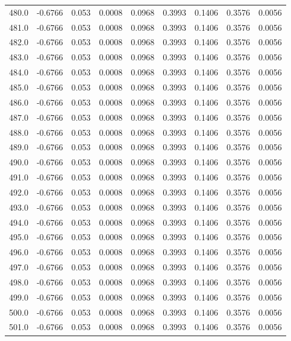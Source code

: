 \begin{longtable}{lrrrrrrrr}
480.0 & -0.6766 & 0.053 & 0.0008 & 0.0968 & 0.3993 & 0.1406 & 0.3576 & 0.0056 \\
481.0 & -0.6766 & 0.053 & 0.0008 & 0.0968 & 0.3993 & 0.1406 & 0.3576 & 0.0056 \\
482.0 & -0.6766 & 0.053 & 0.0008 & 0.0968 & 0.3993 & 0.1406 & 0.3576 & 0.0056 \\
483.0 & -0.6766 & 0.053 & 0.0008 & 0.0968 & 0.3993 & 0.1406 & 0.3576 & 0.0056 \\
484.0 & -0.6766 & 0.053 & 0.0008 & 0.0968 & 0.3993 & 0.1406 & 0.3576 & 0.0056 \\
485.0 & -0.6766 & 0.053 & 0.0008 & 0.0968 & 0.3993 & 0.1406 & 0.3576 & 0.0056 \\
486.0 & -0.6766 & 0.053 & 0.0008 & 0.0968 & 0.3993 & 0.1406 & 0.3576 & 0.0056 \\
487.0 & -0.6766 & 0.053 & 0.0008 & 0.0968 & 0.3993 & 0.1406 & 0.3576 & 0.0056 \\
488.0 & -0.6766 & 0.053 & 0.0008 & 0.0968 & 0.3993 & 0.1406 & 0.3576 & 0.0056 \\
489.0 & -0.6766 & 0.053 & 0.0008 & 0.0968 & 0.3993 & 0.1406 & 0.3576 & 0.0056 \\
490.0 & -0.6766 & 0.053 & 0.0008 & 0.0968 & 0.3993 & 0.1406 & 0.3576 & 0.0056 \\
491.0 & -0.6766 & 0.053 & 0.0008 & 0.0968 & 0.3993 & 0.1406 & 0.3576 & 0.0056 \\
492.0 & -0.6766 & 0.053 & 0.0008 & 0.0968 & 0.3993 & 0.1406 & 0.3576 & 0.0056 \\
493.0 & -0.6766 & 0.053 & 0.0008 & 0.0968 & 0.3993 & 0.1406 & 0.3576 & 0.0056 \\
494.0 & -0.6766 & 0.053 & 0.0008 & 0.0968 & 0.3993 & 0.1406 & 0.3576 & 0.0056 \\
495.0 & -0.6766 & 0.053 & 0.0008 & 0.0968 & 0.3993 & 0.1406 & 0.3576 & 0.0056 \\
496.0 & -0.6766 & 0.053 & 0.0008 & 0.0968 & 0.3993 & 0.1406 & 0.3576 & 0.0056 \\
497.0 & -0.6766 & 0.053 & 0.0008 & 0.0968 & 0.3993 & 0.1406 & 0.3576 & 0.0056 \\
498.0 & -0.6766 & 0.053 & 0.0008 & 0.0968 & 0.3993 & 0.1406 & 0.3576 & 0.0056 \\
499.0 & -0.6766 & 0.053 & 0.0008 & 0.0968 & 0.3993 & 0.1406 & 0.3576 & 0.0056 \\
500.0 & -0.6766 & 0.053 & 0.0008 & 0.0968 & 0.3993 & 0.1406 & 0.3576 & 0.0056 \\
501.0 & -0.6766 & 0.053 & 0.0008 & 0.0968 & 0.3993 & 0.1406 & 0.3576 & 0.0056 \\

\end{longtable}
